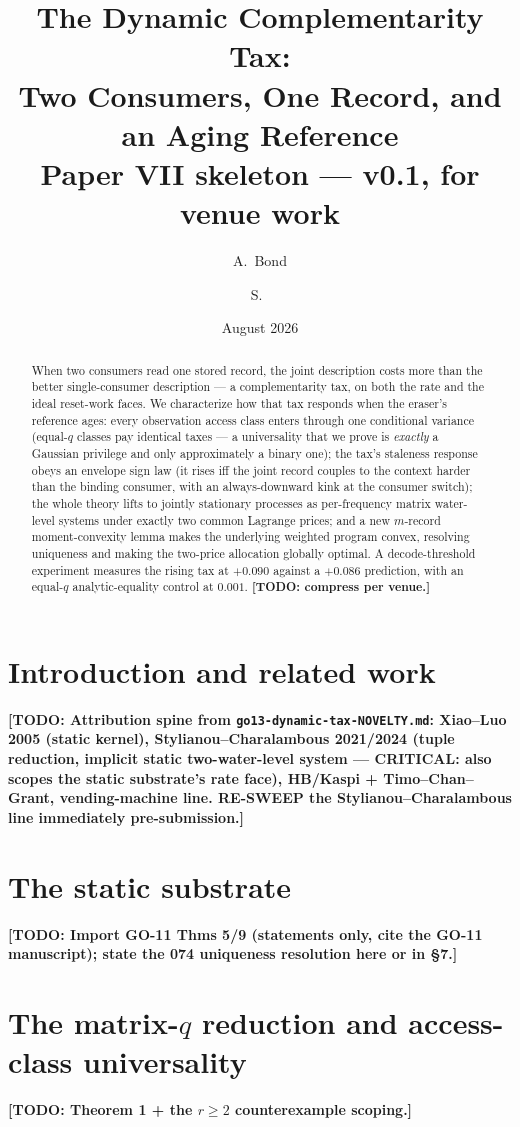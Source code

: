 \documentclass[11pt]{article}
\title{The Dynamic Complementarity Tax:\\Two Consumers, One Record,
and an Aging Reference\\[4pt]\large Paper VII skeleton --- v0.1, for
venue work}
\author{A.~Bond \and S.~\todo{Syed's full name}}
\date{August 2026}
\theoremstyle{remark}
\newcommand{\todo}[1]{\textbf{[TODO: #1]}}
\begin{document}
\maketitle

\begin{abstract}
When two consumers read one stored record, the joint description
costs more than the better single-consumer description --- a
complementarity tax, on both the rate and the ideal reset-work faces.
We characterize how that tax responds when the eraser's reference
ages: every observation access class enters through one conditional
variance (equal-$q$ classes pay identical taxes --- a universality
that we prove is \emph{exactly} a Gaussian privilege and only
approximately a binary one); the tax's staleness response obeys an
envelope sign law (it rises iff the joint record couples to the
context harder than the binding consumer, with an always-downward
kink at the consumer switch); the whole theory lifts to jointly
stationary processes as per-frequency matrix water-level systems
under exactly two common Lagrange prices; and a new $m$-record
moment-convexity lemma makes the underlying weighted program convex,
resolving uniqueness and making the two-price allocation globally
optimal. A decode-threshold experiment measures the rising tax at
$+0.090$ against a $+0.086$ prediction, with an equal-$q$
analytic-equality control at $0.001$. \todo{compress per venue.}
\end{abstract}

\section{Introduction and related work}
\todo{Attribution spine from \texttt{go13-dynamic-tax-NOVELTY.md}:
Xiao--Luo 2005 (static kernel), Stylianou--Charalambous 2021/2024
(tuple reduction, implicit static two-water-level system ---
CRITICAL: also scopes the static substrate's rate face), HB/Kaspi +
Timo--Chan--Grant, vending-machine line. RE-SWEEP the
Stylianou--Charalambous line immediately pre-submission.}

\section{The static substrate}
\todo{Import GO-11 Thms 5/9 (statements only, cite the GO-11
manuscript); state the 074 uniqueness resolution here or in \S7.}

\section{The matrix-$q$ reduction and access-class universality}
\todo{Theorem 1 + the $r\ge2$ counterexample scoping.}
\end{document}
